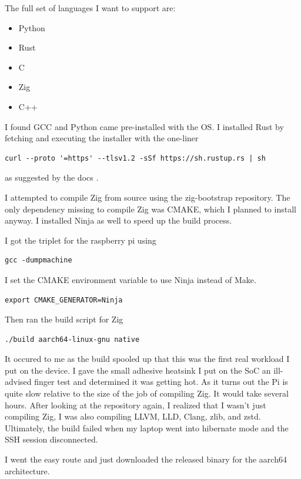 \documentclass[12pt]{article}
\begin{document}
The full set of languages I want to support are:
\begin{itemize}
  \item Python
  \item Rust
  \item C
  \item Zig
  \item C++
\end{itemize}

I found GCC and Python came pre-installed with the OS. 
I installed Rust by fetching and executing the installer with the one-liner 
\begin{lstlisting}
curl --proto '=https' --tlsv1.2 -sSf https://sh.rustup.rs | sh
\end{lstlisting}
as suggested by the docs \cite{rust_installation}.

I attempted to compile Zig from source using the zig-bootstrap \cite{zig-bootstrap} repository. The only dependency missing to compile Zig was CMAKE, which I planned to install anyway. I installed Ninja as well to speed up the build process.

I got the triplet for the raspberry pi using

\begin{lstlisting}
gcc -dumpmachine
\end{lstlisting}

I set the CMAKE environment variable to use Ninja instead of Make.

\begin{lstlisting}
export CMAKE_GENERATOR=Ninja
\end{lstlisting}

Then ran the build script for Zig

\begin{lstlisting}
./build aarch64-linux-gnu native
\end{lstlisting}

It occured to me as the build spooled up that this was the first real workload I put on the device. I gave the small adhesive heatsink I put on the SoC an ill-advised finger test and determined it was getting hot. As it turns out the Pi is quite slow relative to the size of the job of compiling Zig. It would take several hours. After looking at the repository again, I realized that I wasn't just compiling Zig, I was also compiling LLVM, LLD, Clang, zlib, and zstd. Ultimately, the build failed when my laptop went into hibernate mode and the SSH session disconnected.

I went the easy route and just downloaded the released binary for the aarch64 architecture. 
\end{document}
